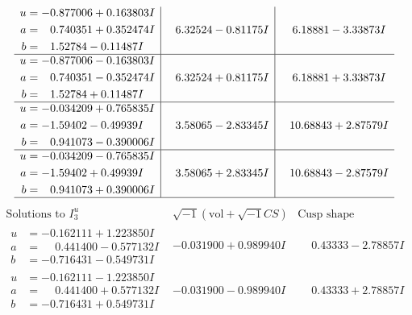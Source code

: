 \documentclass[1p]{elsarticle_modified}
\theoremstyle{definition}
\newcommand{\I}{\sqrt{-1}}
\begin{document}
$$\begin{array}{c|c|c}
\begin{aligned}
u &= -0.877006 + 0.163803 I \\
a &= \phantom{-}0.740351 + 0.352474 I \\
b &= \phantom{-}1.52784 - 0.11487 I\end{aligned}
 & \phantom{-}6.32524 - 0.81175 I & \phantom{-}6.18881 - 3.33873 I \\ \hline\begin{aligned}
u &= -0.877006 - 0.163803 I \\
a &= \phantom{-}0.740351 - 0.352474 I \\
b &= \phantom{-}1.52784 + 0.11487 I\end{aligned}
 & \phantom{-}6.32524 + 0.81175 I & \phantom{-}6.18881 + 3.33873 I \\ \hline\begin{aligned}
u &= -0.034209 + 0.765835 I \\
a &= -1.59402 - 0.49939 I \\
b &= \phantom{-}0.941073 - 0.390006 I\end{aligned}
 & \phantom{-}3.58065 - 2.83345 I & \phantom{-}10.68843 + 2.87579 I \\ \hline\begin{aligned}
u &= -0.034209 - 0.765835 I \\
a &= -1.59402 + 0.49939 I \\
b &= \phantom{-}0.941073 + 0.390006 I\end{aligned}
 & \phantom{-}3.58065 + 2.83345 I & \phantom{-}10.68843 - 2.87579 I\\
 \hline 
 \end{array}$$\newpage$$\begin{array}{c|c|c}  
\text{Solutions to }I^u_{3}& \I (\text{vol} + \sqrt{-1}CS) & \text{Cusp shape}\\
 \hline 
\begin{aligned}
u &= -0.162111 + 1.223850 I \\
a &= \phantom{-}0.441400 - 0.577132 I \\
b &= -0.716431 - 0.549731 I\end{aligned}
 & -0.031900 + 0.989940 I & \phantom{-}0.43333 - 2.78857 I \\ \hline\begin{aligned}
u &= -0.162111 - 1.223850 I \\
a &= \phantom{-}0.441400 + 0.577132 I \\
b &= -0.716431 + 0.549731 I\end{aligned}
 & -0.031900 - 0.989940 I & \phantom{-}0.43333 + 2.78857 I \\ \hline\begin{aligned}

\end{aligned}
\end{array}$$
\end{document}
